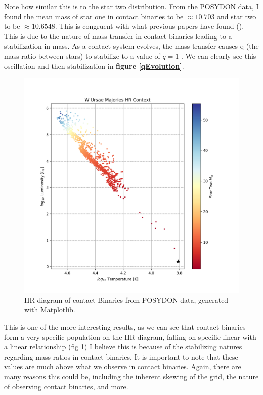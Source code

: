 \documentclass[12pt, a4paper]{article}
\begin{document}
        Note how similar this is to the star two distribution. From the POSYDON data, I found the mean mass of star one in contact binaries to be $\approx 10.703$ and star two to be $\approx 10.6548$. This is congruent with what previous papers have found (\cite{Fabry_2025}). This is due to the nature of mass transfer in contact binaries leading to a stabilization in mass. As a contact system evolves, the mass transfer causes q (the mass ratio between stars) to stabilize to a value of $q=1$ \cite{Fabry_2025}. We can clearly see this oscillation and then stabilization in \textbf{figure \ref{qEvolution}}.

        \begin{figure}[H]
            \centering
            \includegraphics[scale = .6]{figs/GeneratedFigs/W_UMa/WUMaHRDiagram.png}
            \caption{HR diagram of contact Binaries from POSYDON data, generated with Matplotlib.}
            \label{contactBinaryHRDiagram}
        \end{figure}


        This is one of the more interesting results, as we can see that contact binaries form a very specific population on the HR diagram, falling on specific linear with a linear relationship (fig \ref{contactBinaryHRDiagram}) I believe this is because of the stabilizing natures regarding mass ratios in contact binaries. It is important to note that these values are much above what we observe in contact binaries. Again, there are many reasons this could be, including the inherent skewing of the grid, the nature of observing contact binaries, and more. 
        
\end{document}
